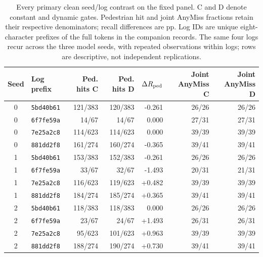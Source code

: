 \begin{table}[t]
\centering
\footnotesize
\setlength{\tabcolsep}{5.0pt}
\caption{Every primary clean seed/log contrast on the fixed panel. C and D denote constant and dynamic gates. Pedestrian hit and joint AnyMiss fractions retain their respective denominators; recall differences are pp. Log IDs are unique eight-character prefixes of the full tokens in the companion records. The same four logs recur across the three model seeds, with repeated observations within logs; rows are descriptive, not independent replications.}
\label{tab:new_primary_per_log}
\begin{tabular}{clrrrrr}
\toprule
Seed & Log prefix & Ped. hits C & Ped. hits D & $\Delta R_{\rm ped}$ & Joint AnyMiss C & Joint AnyMiss D \\
\midrule
0 & \texttt{5bd40b61} & 121/383 & 120/383 & -0.261 & 26/26 & 26/26 \\
0 & \texttt{6f7fe59a} & 14/67 & 14/67 & 0.000 & 27/31 & 27/31 \\
0 & \texttt{7e25a2c8} & 114/623 & 114/623 & 0.000 & 39/39 & 39/39 \\
0 & \texttt{881dd2f8} & 161/274 & 160/274 & -0.365 & 39/41 & 39/41 \\
1 & \texttt{5bd40b61} & 153/383 & 152/383 & -0.261 & 26/26 & 26/26 \\
1 & \texttt{6f7fe59a} & 33/67 & 32/67 & -1.493 & 20/31 & 21/31 \\
1 & \texttt{7e25a2c8} & 116/623 & 119/623 & +0.482 & 39/39 & 39/39 \\
1 & \texttt{881dd2f8} & 184/274 & 185/274 & +0.365 & 39/41 & 39/41 \\
2 & \texttt{5bd40b61} & 118/383 & 118/383 & 0.000 & 26/26 & 26/26 \\
2 & \texttt{6f7fe59a} & 23/67 & 24/67 & +1.493 & 26/31 & 26/31 \\
2 & \texttt{7e25a2c8} & 95/623 & 101/623 & +0.963 & 39/39 & 39/39 \\
2 & \texttt{881dd2f8} & 188/274 & 190/274 & +0.730 & 39/41 & 39/41 \\
\bottomrule
\end{tabular}
\end{table}
